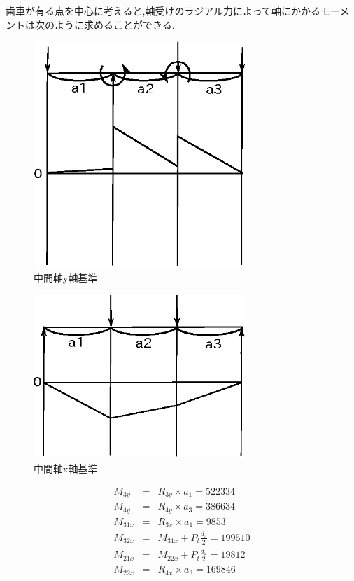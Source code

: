 歯車が有る点を中心に考えると,軸受けのラジアル力によって軸にかかるモーメントは次のように求めることができる.
\begin{figure}[htbp]
\begin{center}
\includegraphics[width=8cm]{../pictures/twocwx.eps}
\end{center}
\caption{中間軸y軸基準}
\end{figure}
\begin{figure}[htbp]
\begin{center}
\includegraphics[width=8cm]{../pictures/twocwy.eps}
\end{center}
\caption{中間軸x軸基準}
\end{figure}
\begin{eqnarray}
M_{3y}  &=& R_{3y} \times a_1          =522334\\
M_{4y}  &=& R_{4y} \times a_3          =386634\\
M_{31x} &=& R_{3x} \times a_1          =9853\\
M_{32x} &=& M_{31x} + P_t \frac{d_3}{2} =199510\\
M_{21x} &=& M_{22x} + P_t \frac{d_2}{2} =19812\\
M_{22x} &=& R_{4x} \times a_3           =169846\\
\end{eqnarray}

